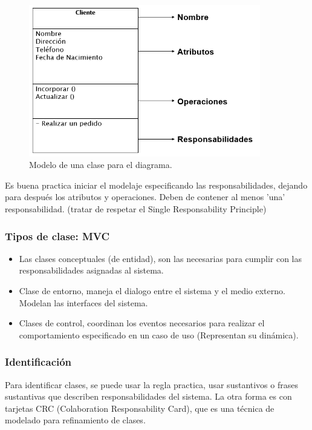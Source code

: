 \documentclass[titlepage,a4paper]{article}
\begin{document}
\begin{figure}[!htb]
    \centering
    \includegraphics[width=0.9\textwidth]{Imagenes/Clase.png}
    \caption{Modelo de una clase para el diagrama.}
\end{figure}

Es buena practica iniciar el modelaje especificando las responsabilidades, dejando para después los atributos y operaciones. Deben de contener al menos 'una' responsabilidad. (tratar de respetar el Single Responsability Principle)

\subsubsection*{Tipos de clase: MVC}
\begin{itemize}
    \item Las clases conceptuales (de entidad), son las necesarias para cumplir con las responsabilidades asignadas al sistema.
    \item Clase de entorno, maneja el dialogo entre el sistema y el medio externo. Modelan las interfaces del sistema.
    \item Clases de control, coordinan los eventos necesarios para realizar el comportamiento especificado en un caso de uso (Representan su dinámica).
\end{itemize}


\subsubsection*{Identificación}

Para identificar clases, se puede usar la regla practica, usar sustantivos o frases sustantivas que describen responsabilidades del sistema. La otra forma es con tarjetas CRC (Colaboration Responsability Card), que es una técnica de modelado para refinamiento de clases.
\end{document}
